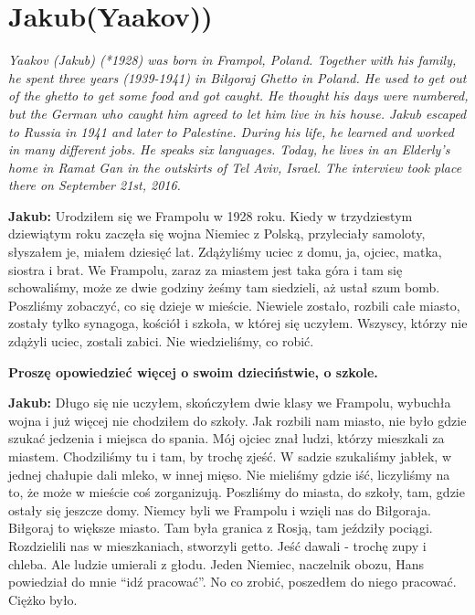 \section{Jakub(Yaakov))}
\begin{otherlanguage}{polish}
\textit{Yaakov (Jakub) (*1928) was born in Frampol, Poland. Together with his family, he spent three years (1939-1941) in Biłgoraj Ghetto in Poland. He used to get out of the ghetto to get some food and got caught. He thought his days were numbered, but the German who caught him agreed to let him live in his house. Jakub escaped to Russia in 1941 and later to Palestine. During his life, he learned and worked in many different jobs. He speaks six languages. Today, he lives in an Elderly’s home in Ramat Gan in the outskirts of Tel Aviv, Israel. The interview took place there on September 21st, 2016.}\par
\vspace*{2em}
\textbf{Jakub:} Urodziłem się we Frampolu w 1928 roku. Kiedy w trzydziestym dziewiątym roku zaczęła się wojna Niemiec z Polską, przyleciały samoloty, słyszałem je, miałem dziesięć lat. Zdążyliśmy uciec z domu, ja, ojciec, matka, siostra i brat. We Frampolu, zaraz za miastem jest taka góra i tam się schowaliśmy, może ze dwie godziny żeśmy tam siedzieli, aż ustał szum bomb. Poszliśmy zobaczyć, co się dzieje w mieście. Niewiele zostało, rozbili całe miasto, zostały tylko synagoga, kościół i szkoła, w której się uczyłem. Wszyscy, którzy nie zdążyli uciec, zostali zabici. Nie wiedzieliśmy, co robić.  

\textbf{Proszę opowiedzieć więcej o swoim dzieciństwie, o szkole.} 

\textbf{Jakub:} Długo się nie uczyłem, skończyłem dwie klasy we Frampolu, wybuchła wojna i już więcej nie chodziłem do szkoły. Jak rozbili nam miasto, nie było gdzie szukać jedzenia i miejsca do spania. Mój ojciec znał ludzi, którzy mieszkali za miastem. Chodziliśmy tu i tam, by trochę zjeść. W sadzie szukaliśmy jabłek, w jednej chałupie dali mleko, w innej mięso. Nie mieliśmy gdzie iść, liczyliśmy na to, że może w mieście coś zorganizują. Poszliśmy do miasta, do szkoły, tam, gdzie ostały się jeszcze domy. Niemcy byli we Frampolu i wzięli nas do Biłgoraja. Biłgoraj to większe miasto. Tam była granica z Rosją, tam jeździły pociągi. Rozdzielili nas w mieszkaniach, stworzyli getto. Jeść dawali - trochę zupy i chleba. Ale ludzie umierali z głodu. Jeden Niemiec, naczelnik obozu, Hans powiedział do mnie "`idź pracować"'. No co zrobić, poszedłem do niego pracować. Ciężko było.


\end{otherlanguage}
